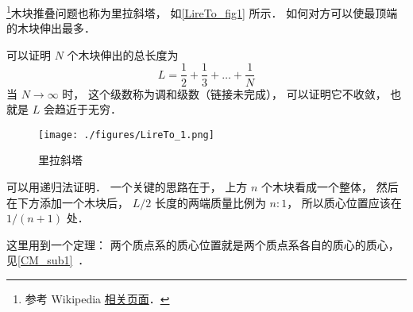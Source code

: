 
\begin{issues}
\issueDraft
\end{issues}


\footnote{参考 Wikipedia \href{https://en.wikipedia.org/wiki/Block-stacking_problem}{相关页面}．}木块推叠问题也称为里拉斜塔， 如\autoref{LireTo_fig1} 所示． 如何对方可以使最顶端的木块伸出最多．

可以证明 $N$ 个木块伸出的总长度为
\begin{equation}
L = \frac{1}{2} + \frac{1}{3} + \dots + \frac{1}{N}
\end{equation}
当 $N\to\infty$ 时， 这个级数称为调和级数（链接未完成）， 可以证明它不收敛， 也就是 $L$ 会趋近于无穷．

\begin{figure}[ht]
\centering
\texttt{[image: ./figures/LireTo\_1.png]}
\caption{里拉斜塔} \label{LireTo_fig1}
\end{figure}

可以用递归法证明． 一个关键的思路在于， 上方 $n$ 个木块看成一个整体， 然后在下方添加一个木块后， $L/2$ 长度的两端质量比例为 $n:1$， 所以质心位置应该在 $1/(n+1)$ 处．

这里用到一个定理： 两个质点系的质心位置就是两个质点系各自的质心的质心， 见\autoref{CM_sub1}~．


